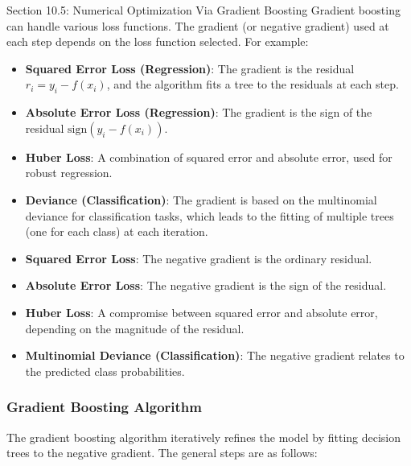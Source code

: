 \begin{notes}{Section 10.5: Numerical Optimization Via Gradient Boosting}
    Gradient boosting can handle various loss functions. The gradient (or negative gradient) used at each step depends on the loss function selected. For example:
    \begin{itemize}
        \item \textbf{Squared Error Loss (Regression)}: The gradient is the residual $r_i = y_i - f(x_i)$, and the algorithm fits a tree to the residuals at each step.
        \item \textbf{Absolute Error Loss (Regression)}: The gradient is the sign of the residual $\text{sign}(y_i - f(x_i))$.
        \item \textbf{Huber Loss}: A combination of squared error and absolute error, used for robust regression.
        \item \textbf{Deviance (Classification)}: The gradient is based on the multinomial deviance for classification tasks, which leads to the fitting of multiple trees (one for each class) at each iteration.
    \end{itemize}
    
    \begin{highlight}
        \begin{itemize}
            \item \textbf{Squared Error Loss}: The negative gradient is the ordinary residual.
            \item \textbf{Absolute Error Loss}: The negative gradient is the sign of the residual.
            \item \textbf{Huber Loss}: A compromise between squared error and absolute error, depending on the magnitude of the residual.
            \item \textbf{Multinomial Deviance (Classification)}: The negative gradient relates to the predicted class probabilities.
        \end{itemize}
    \end{highlight}
    
    \subsubsection*{Gradient Boosting Algorithm}
    
    The gradient boosting algorithm iteratively refines the model by fitting decision trees to the negative gradient. The general steps are as follows:
    

\end{notes}
